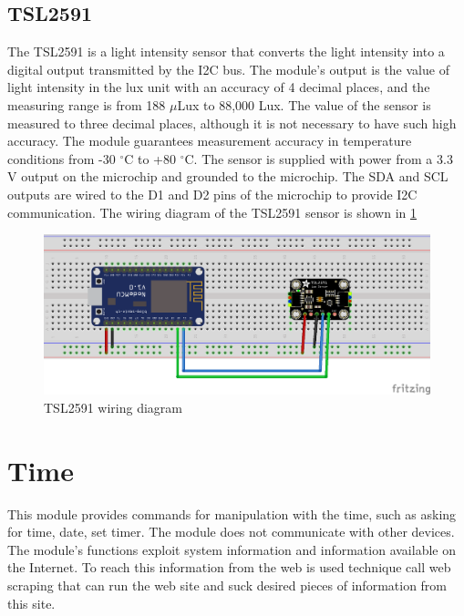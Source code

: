 \subsection{TSL2591}

The TSL2591 \citep{TSL2591:Datasheet} is a light intensity sensor that converts the light intensity into a digital output transmitted by the I2C bus. The module's output is the value of light intensity in the lux unit with an accuracy of 4 decimal places, and the measuring range is from 188 $\mu$Lux to 88,000 Lux. The value of the sensor is measured to three decimal places, although it is not necessary to have such high accuracy. The module guarantees measurement accuracy in temperature conditions from -30 $^{\circ}$C to +80 $^{\circ}$C. The sensor is supplied with power from a 3.3 V output on the microchip and grounded to the microchip. The SDA and SCL outputs are wired to the D1 and D2 pins of the microchip to provide I2C communication. The wiring diagram of the TSL2591 sensor is shown in \cref{fig:tsl2591_schema}

\begin{figure}[H]
	\centering
	\includegraphics[width=\textwidth]{img/tsl2591_schema.png}
	\caption{TSL2591 wiring diagram}
	\label{fig:tsl2591_schema}
\end{figure}

\section{Time}

This module provides commands for manipulation with the time, such as asking for time, date, set timer. The module does not communicate with other devices. The module's functions exploit system information and information available on the Internet. To reach this information from the web is used technique call web scraping that can run the web site and suck desired pieces of information from this site. 


